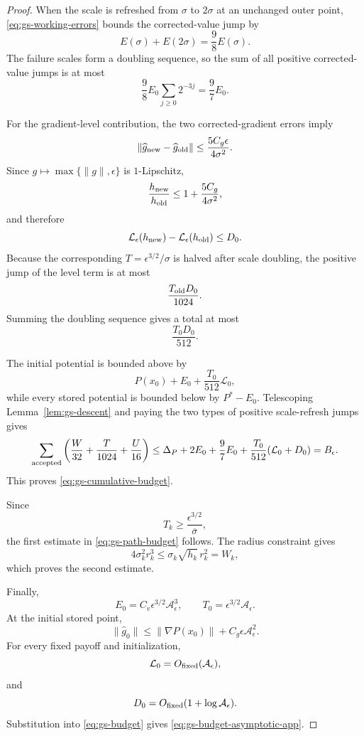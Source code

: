 \begin{proof}
When the scale is refreshed from $\sigma$ to $2\sigma$ at an
unchanged outer point,
\eqref{eq:gs-working-errors} bounds the corrected-value jump by
\[
    E(\sigma)+E(2\sigma)
    =
    \frac98E(\sigma).
\]
The failure scales form a doubling sequence, so the sum of all
positive corrected-value jumps is at most
\[
    \frac98E_0
    \sum_{j\ge0}2^{-3j}
    =
    \frac97E_0.
\]

For the gradient-level contribution,
the two corrected-gradient errors imply
\[
    \|\widehat g_{\rm new}
    -
    \widehat g_{\rm old}\|
    \le
    \frac{5C_g\epsilon}{4\sigma^2}.
\]
Since
$g\mapsto\max\{\|g\|,\epsilon\}$ is $1$-Lipschitz,
\[
    \frac{h_{\rm new}}{h_{\rm old}}
    \le
    1+
    \frac{5C_g}{4\sigma^2},
\]
and therefore
\[
    \mathcal L_\epsilon(h_{\rm new})
    -
    \mathcal L_\epsilon(h_{\rm old})
    \le
    D_0.
\]
Because the corresponding
$T=\epsilon^{3/2}/\sigma$ is halved after scale doubling, the positive
jump of the level term is at most
\[
    \frac{T_{\rm old}D_0}{1024}.
\]
Summing the doubling sequence gives a total at most
\[
    \frac{T_0D_0}{512}.
\]

The initial potential is bounded above by
\[
    P(x_0)
    +
    E_0
    +
    \frac{T_0}{512}\mathcal L_0,
\]
while every stored potential is bounded below by
$P^*-E_0$.
Telescoping
Lemma~\ref{lem:gs-descent}
and paying the two types of positive scale-refresh jumps gives
\[
    \sum_{\rm accepted}
    \left(
        \frac W{32}
        +
        \frac T{1024}
        +
        \frac U{16}
    \right)
    \le
    \Delta_P
    +
    2E_0
    +
    \frac97E_0
    +
    \frac{T_0}{512}
    (\mathcal L_0+D_0)
    =
    B_\epsilon.
\]
This proves
\eqref{eq:gs-cumulative-budget}.

Since
\[
    T_k
    \ge
    \frac{\epsilon^{3/2}}{\overline\sigma},
\]
the first estimate in
\eqref{eq:gs-path-budget} follows.
The radius constraint gives
\[
    4\sigma_k^2r_k^3
    \le
    \sigma_k\sqrt{h_k}\,r_k^2
    =
    W_k,
\]
which proves the second estimate.

Finally,
\[
    E_0
    =
    C_v\epsilon^{3/2}
    \mathcal A_\epsilon^3,
    \qquad
    T_0
    =
    \epsilon^{3/2}
    \mathcal A_\epsilon.
\]
At the initial stored point,
\[
    \|\widehat g_0\|
    \le
    \|\nabla P(x_0)\|
    +
    C_g\epsilon
    \mathcal A_\epsilon^2.
\]
For every fixed payoff and initialization,
\[
    \mathcal L_0
    =
    O_{\rm fixed}(\mathcal A_\epsilon),
\]
and
\[
    D_0
    =
    O_{\rm fixed}
    (1+\log\mathcal A_\epsilon).
\]
Substitution into \eqref{eq:gs-budget} gives
\eqref{eq:gs-budget-asymptotic-app}.
\end{proof}


